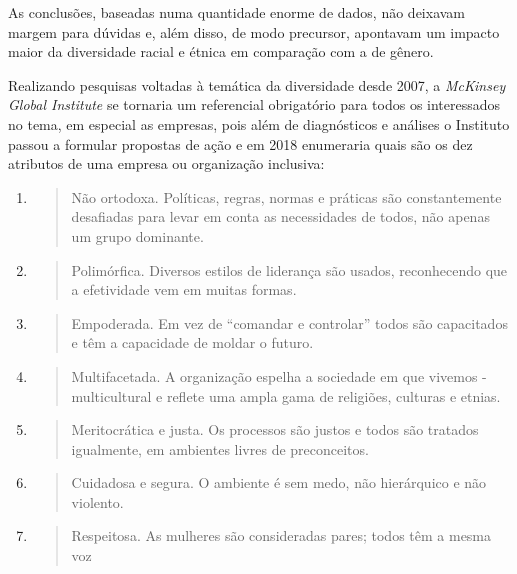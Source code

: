 As conclusões, baseadas numa quantidade enorme de dados, não deixavam
margem para dúvidas e, além disso, de modo precursor, apontavam um
impacto maior da diversidade racial e étnica em comparação com a de
gênero.

Realizando pesquisas voltadas à temática da diversidade desde 2007, a
\emph{McKinsey Global Institute} se tornaria um referencial obrigatório
para todos os interessados no tema, em especial as empresas, pois além
de diagnósticos e análises o Instituto passou a formular propostas de
ação e em 2018 enumeraria quais são os dez atributos de uma empresa ou
organização inclusiva:

\begin{enumerate}
\def\labelenumi{\arabic{enumi})}
\item
  \begin{quote}
  Não ortodoxa. Políticas, regras, normas e práticas são constantemente
  desafiadas para levar em conta as necessidades de todos, não apenas um
  grupo dominante.
  \end{quote}
\item
  \begin{quote}
  Polimórfica. Diversos estilos de liderança são usados, reconhecendo
  que a efetividade vem em muitas formas.
  \end{quote}
\item
  \begin{quote}
  Empoderada. Em vez de ``comandar e controlar'' todos são capacitados e
  têm a capacidade de moldar o futuro.
  \end{quote}
\item
  \begin{quote}
  Multifacetada. A organização espelha a sociedade em que vivemos -
  multicultural e reflete uma ampla gama de religiões, culturas e
  etnias.
  \end{quote}
\item
  \begin{quote}
  Meritocrática e justa. Os processos são justos e todos são tratados
  igualmente, em ambientes livres de preconceitos.
  \end{quote}
\item
  \begin{quote}
  Cuidadosa e segura. O ambiente é sem medo, não hierárquico e não
  violento.
  \end{quote}
\item
  \begin{quote}
  Respeitosa. As mulheres são consideradas pares; todos têm a mesma voz

\end{quote}
\end{enumerate}
